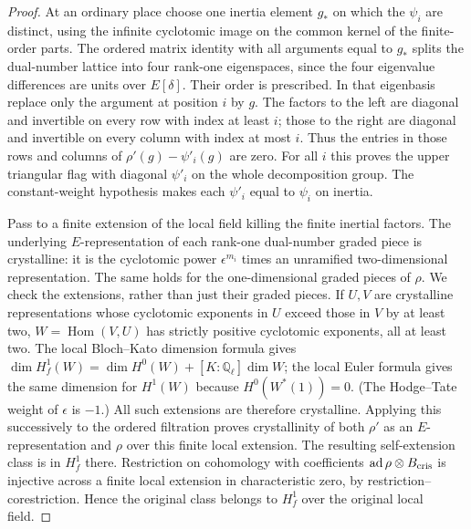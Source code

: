 \begin{proof}
At an ordinary place choose one inertia element $g_*$ on which the
$\psi_i$ are distinct, using the infinite cyclotomic image on the
common kernel of the finite-order parts. The ordered matrix identity
with all arguments equal to $g_*$ splits the dual-number lattice
into four rank-one eigenspaces, since the four eigenvalue
differences are units over $E[\delta]$. Their order is prescribed.
In that eigenbasis replace only the argument at position $i$ by
$g$. The factors to the left are diagonal and invertible on every
row with index at least $i$; those to the right are diagonal and
invertible on every column with index at most $i$. Thus the entries
in those rows and columns of $\rho'(g)-\psi'_i(g)$ are zero.
For all $i$ this proves the upper triangular flag with diagonal
$\psi'_i$ on the whole decomposition group. The constant-weight
hypothesis makes each $\psi'_i$ equal to $\psi_i$ on inertia.

Pass to a finite extension of the local field killing the finite
inertial factors. The underlying $E$-representation of each
rank-one dual-number graded piece is crystalline: it is the
cyclotomic power $\epsilon^{m_i}$ times an unramified
two-dimensional representation. The same holds for the
one-dimensional graded pieces of $\rho$. We check the extensions,
rather than just their graded pieces. If $U,V$ are crystalline
representations whose cyclotomic exponents in $U$ exceed those in
$V$ by at least two, $W=\operatorname{Hom}(V,U)$ has strictly
positive cyclotomic exponents, all at least two. The local
Bloch--Kato dimension formula gives
$\dim H^1_f(W)=\dim H^0(W)+[K:\mathbb Q_\ell]\dim W$; the local Euler
formula gives the same dimension for $H^1(W)$ because
$H^0(W^*(1))=0$. (The Hodge--Tate weight of $\epsilon$ is $-1$.)
All such extensions are therefore crystalline. Applying this
successively to the ordered filtration proves crystallinity of
both $\rho'$ as an $E$-representation and $\rho$ over this finite
local extension. The resulting self-extension class is in
$H^1_f$ there. Restriction on cohomology with coefficients
$\operatorname{ad}\rho\otimes B_{\rm cris}$ is injective across
a finite local extension in characteristic zero, by
restriction--corestriction. Hence the original class belongs to
$H^1_f$ over the original local field.


\end{proof}
